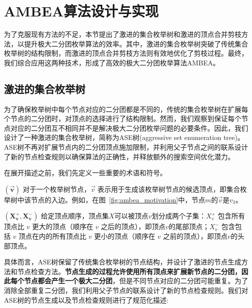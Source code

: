 \section{AMBEA算法设计与实现}

为了克服现有方法的不足，本节提出了激进的集合枚举树和激进的顶点合并剪枝方法，以提升极大二分团枚举算法的效率。其中，激进的集合枚举树突破了传统集合枚举树的结构限制，而激进的顶点合并剪枝方法则有效地优化了剪枝过程。最终，我们综合应用这两种技术，形成了高效的极大二分团枚举算法AMBEA。

\subsection{激进的集合枚举树}
\label{subsec:ase}

为了确保枚举树中每个节点对应的二分团都是不同的，传统的集合枚举树在扩展每个节点的二分团时，对顶点的选择进行了结构限制。然而，我们观察到保证每个节点对应的二分团互不相同并不是解决极大二分团枚举问题的必要条件。因此，我们设计了一种激进的集合枚举树，简称为ASE树(aggressive set enumeration tree)。ASE树不再对扩展节点内的二分团顶点施加限制，并利用父子节点之间的联系设计了新的节点检查规则以确保算法的正确性，并释放额外的搜索空间优化潜力。

在展开描述之前，我们先定义一些重要的术语和符号。

\begin{definition}
  $(\vec{\mathbf{v}})$ 对于一个枚举树节点，$\vec{v}$ 表示用于生成该枚举树节点的候选顶点，即集合枚举树中该节点的入边。例如，在图~\ref{fig:ambea_motivation}中，节点$m$的$\vec{v}$是$v_3$。
\end{definition}

\begin{definition}
  $(\mathbf{X_v^+, X_v^-})$ 给定顶点顺序，顶点集$X$可以被顶点$v$划分成两个子集：$X_v^+$ 包含所有顶点比 $v$ 更大的顶点（顺序在 $v$ 之后的顶点），即顶点$v$的尾部顶点；$X_v^-$ 包含包括 $v$ 顶点在内的所有顶点比 $v$ 更小的顶点（顺序在 $v$ 之前的顶点），即顶点$v$的头部顶点。
\end{definition}


具体而言，ASE树保留了传统集合枚举树的节点结构，并设计了激进的节点生成方法和节点检查方法。\textbf{节点生成的过程允许使用所有顶点来扩展新节点的二分团，因此每个节点都会产生一个极大二分团}，但是不同节点对应的二分团可能重复。为了消除全部重复二分团，我们利用父子节点的联系设计了新的节点检查规则。我们对ASE树的节点生成以及节点检查规则进行了规范化描述:

